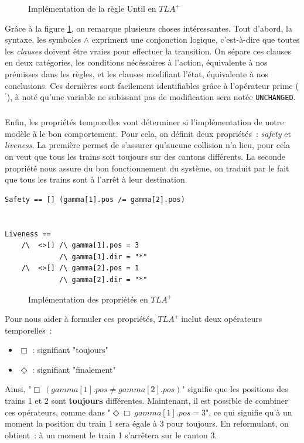 \documentclass[oneside, a4paper, 11pt]{book}
\newcommand{\TLA}{\ensuremath{TLA^+~}}
\begin{document}
\begin{figure}[h]
	\caption{Implémentation de la règle Until en \TLA}
	\label{fig:untilTLA}
\end{figure}

Grâce à la figure \ref{fig:untilTLA}, on remarque plusieurs choses intéressantes. Tout d'abord, la syntaxe, les symboles $\wedge$ expriment une conjonction logique, c'est-à-dire que toutes les \textit{clauses} doivent être vraies pour effectuer la transition.
On sépare ces clauses en deux catégories, les conditions nécéssaires à l'action, équivalente à nos prémisses dans les règles, et les clauses modifiant l'état, équivalente à nos conclusions. Ces dernières sont facilement identifiables grâce à l'opérateur prime ($^\prime$), à noté qu'une variable ne subissant pas de modification sera notée \texttt{UNCHANGED}.

\subparagraph{} Enfin, les propriétés temporelles vont déterminer si l'implémentation de notre modèle à le bon comportement. Pour cela, on définit deux propriétés~: \textit{safety} et \textit{liveness}.
La première permet de s'assurer qu'aucune collision n'a lieu, pour cela on veut que tous les trains soit toujours sur des cantons différents. La seconde propriété nous assure du bon fonctionnement du système, on traduit par le fait que tous les trains sont à l'arrêt à leur destination.


\begin{verbatim}
Safety == [] (gamma[1].pos /= gamma[2].pos)


Liveness == 
    /\  <>[] /\ gamma[1].pos = 3
             /\ gamma[1].dir = "*"
    /\  <>[] /\ gamma[2].pos = 1
             /\ gamma[2].dir = "*"
\end{verbatim}

\begin{figure}[h]
	\caption{Implémentation des propriétés en \TLA}
	\label{fig:propertiesTLA}
\end{figure}

\noindent
Pour nous aider à formuler ces propriétés, \TLA inclut deux opérateurs temporelles~:
\begin{itemize}
	\item $\Box$ : signifiant "toujours"
	\item $\Diamond$ : signifiant "finalement"
\end{itemize}
\noindent
Ainsi, "$\Box~(gamma[1].pos \neq gamma[2].pos)$" signifie que les positions des trains 1 et 2 sont \textbf{toujours} différentes.
Maintenant, il est possible de combiner ces opérateurs, comme dans "$\Diamond \Box~gamma[1].pos = 3$", ce qui signifie qu'à un moment la position du train 1 sera égale à 3 pour toujours. En reformulant, on obtient~: à un moment le train 1 s'arrêtera sur le canton 3.
\end{document}
